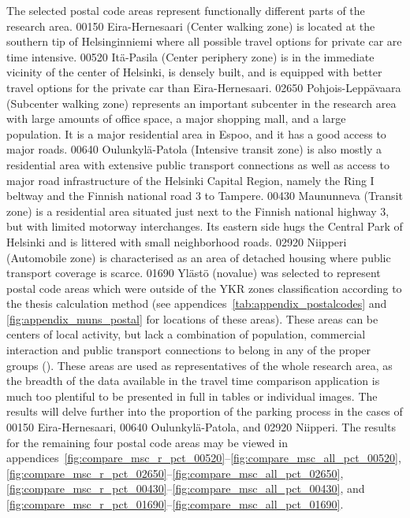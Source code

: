 The selected postal code areas represent functionally different parts of the research area. 00150 Eira-Hernesaari (Center walking zone) is located at the southern tip of Helsinginniemi where all possible travel options for private car are time intensive. 00520 Itä-Pasila (Center periphery zone) is in the immediate vicinity of the center of Helsinki, is densely built, and is equipped with better travel options for the private car than Eira-Hernesaari. 02650 Pohjois-Leppävaara (Subcenter walking zone) represents an important subcenter in the research area with large amounts of office space, a major shopping mall, and a large population. It is a major residential area in Espoo, and it has a good access to major roads. 00640 Oulunkylä-Patola (Intensive transit zone) is also mostly a residential area with extensive public transport connections as well as access to major road infrastructure of the Helsinki Capital Region, namely the Ring I beltway and the Finnish national road 3 to Tampere. 00430 Maununneva (Transit zone) is a residential area situated just next to the Finnish national highway 3, but with limited motorway interchanges. Its eastern side hugs the Central Park of Helsinki and is littered with small neighborhood roads. 02920 Niipperi (Automobile zone) is characterised as an area of detached housing where public transport coverage is scarce. 01690 Ylästö (novalue) was selected to represent postal code areas which were outside of the YKR zones classification according to the thesis calculation method (see appendices~\ref{tab:appendix_postalcodes} and \ref{fig:appendix_muns_postal} for locations of these areas). These areas can be centers of local activity, but lack a combination of population, commercial interaction and public transport connections to belong in any of the proper  groups (\cite{Ristimaki2017}). These areas are used as representatives of the whole research area, as the breadth of the data available in the travel time comparison application is much too plentiful to be presented in full in tables or individual images. The results will delve further into the proportion of the parking process in the cases of 00150 Eira-Hernesaari, 00640 Oulunkylä-Patola, and 02920 Niipperi. The results for the remaining four postal code areas may be viewed in appendices~\ref{fig:compare_msc_r_pct_00520}--\ref{fig:compare_msc_all_pct_00520}, \ref{fig:compare_msc_r_pct_02650}--\ref{fig:compare_msc_all_pct_02650}, \ref{fig:compare_msc_r_pct_00430}--\ref{fig:compare_msc_all_pct_00430}, and \ref{fig:compare_msc_r_pct_01690}--\ref{fig:compare_msc_all_pct_01690}.


